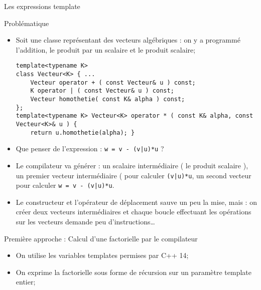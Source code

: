 \documentclass[handout,10pt]{beamer}
\newcommand{\includepartcode}[4][cpp]{

}
\begin{document}
\begin{frame}[fragile]{Les expressions template}
\tiny
\begin{alertblock}{Problématique}
\begin{itemize}
\item Soit une classe représentant des vecteurs algébriques : on y a programmé l'addition, le produit par un scalaire et le produit scalaire;
\begin{lstlisting}
template<typename K>
class Vecteur<K> { ...
    Vecteur operator + ( const Vecteur& u ) const;
    K operator | ( const Vecteur& u ) const;
    Vecteur homothetie( const K& alpha ) const;
};
template<typename K> Vecteur<K> operator * ( const K& alpha, const Vecteur<K>& u ) {
    return u.homothetie(alpha); }
\end{lstlisting}
\item Que penser de l'expression : \lstinline$w = v - (v|u)*u$ ?
\item Le compilateur va générer : un scalaire intermédiaire ( le produit scalaire ), un premier vecteur intermédiaire ( pour calculer
\lstinline$(v|u)*u$, un second vecteur pour calculer \lstinline$w = v - (v|u)*u$.
\item Le constructeur et l'opérateur de déplacement sauve un peu la mise, mais : on créer deux vecteurs intermédiaires et chaque boucle effectuant les opérations sur les vecteurs demande peu d'instructions\ldots
\end{itemize}
\end{alertblock}

\begin{exampleblock}{Première approche : Calcul d'une factorielle par le compilateur}
\begin{itemize}
\item On utilise les variables templates permises par C++ 14;
\item On exprime la factorielle sous forme de récursion sur un paramètre template entier;
\end{itemize}
\includepartcode{factorial_template.cpp}{3}{6}
\end{exampleblock}
\end{frame}
\end{document}
